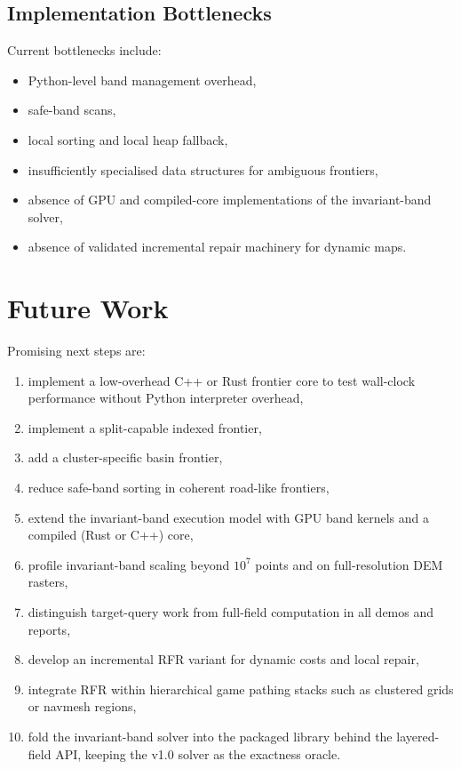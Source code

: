 \documentclass[11pt]{article}
\newcommand{\RFR}{\textsc{RFR}}
\begin{document}
\subsection{Implementation Bottlenecks}

Current bottlenecks include:

\begin{itemize}
  \item Python-level band management overhead,
  \item safe-band scans,
  \item local sorting and local heap fallback,
  \item insufficiently specialised data structures for ambiguous frontiers,
  \item absence of GPU and compiled-core implementations of the invariant-band solver,
  \item absence of validated incremental repair machinery for dynamic maps.
\end{itemize}

\section{Future Work}

Promising next steps are:

\begin{enumerate}
  \item implement a low-overhead C++ or Rust frontier core to test wall-clock performance without Python interpreter overhead,
  \item implement a split-capable indexed frontier,
  \item add a cluster-specific basin frontier,
  \item reduce safe-band sorting in coherent road-like frontiers,
  \item extend the invariant-band execution model with GPU band kernels and a compiled (Rust or C++) core,
  \item profile invariant-band scaling beyond $10^7$ points and on full-resolution DEM rasters,
  \item distinguish target-query work from full-field computation in all demos and reports,
  \item develop an incremental \RFR{} variant for dynamic costs and local repair,
  \item integrate \RFR{} within hierarchical game pathing stacks such as clustered grids or navmesh regions,
  \item fold the invariant-band solver into the packaged library behind the layered-field API, keeping the v1.0 solver as the exactness oracle.
\end{enumerate}
\end{document}
